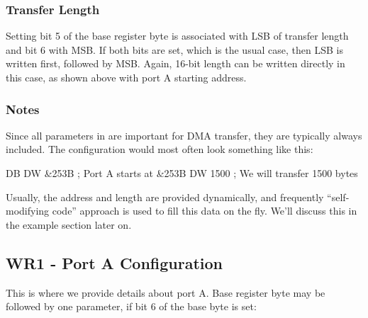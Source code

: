 \subsubsection{Transfer Length}{

Setting bit 5 of the base register byte is associated with LSB of transfer length and bit 6 with MSB. If both bits are set, which is the usual case, then LSB is written first, followed by MSB. Again, 16-bit length can be written directly in this case, as shown above with port A starting address.


\subsubsection{Notes}

Since all parameters in  are important for DMA transfer, they are typically always included. The configuration would most often look something like this:

\begin{tcblisting}{}
	DB %
	DW &253B          ; Port A starts at &253B
	DW 1500           ; We will transfer 1500 bytes
\end{tcblisting}

Usually, the address and length are provided dynamically, and frequently ``self-modifying code'' approach is used to fill this data on the fly. We'll discuss this in the example section later on.



\pagebreak
\subsection{WR1 - Port A Configuration}


This is where we provide details about port A. Base register byte may be followed by one parameter, if bit 6 of the base byte is set:

}
